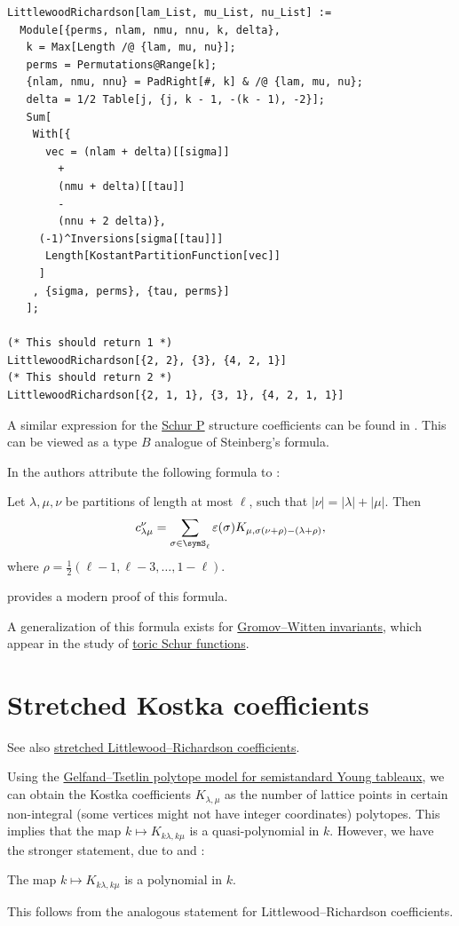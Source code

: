 \begin{lstlisting}
LittlewoodRichardson[lam_List, mu_List, nu_List] := 
  Module[{perms, nlam, nmu, nnu, k, delta},
   k = Max[Length /@ {lam, mu, nu}];
   perms = Permutations@Range[k];
   {nlam, nmu, nnu} = PadRight[#, k] & /@ {lam, mu, nu};
   delta = 1/2 Table[j, {j, k - 1, -(k - 1), -2}];
   Sum[
    With[{
      vec = (nlam + delta)[[sigma]]
        +
        (nmu + delta)[[tau]]
        -
        (nnu + 2 delta)},
     (-1)^Inversions[sigma[[tau]]]
      Length[KostantPartitionFunction[vec]]
     ]
    , {sigma, perms}, {tau, perms}]
   ];

(* This should return 1 *)
LittlewoodRichardson[{2, 2}, {3}, {4, 2, 1}]
(* This should return 2 *)
LittlewoodRichardson[{2, 1, 1}, {3, 1}, {4, 2, 1, 1}]

\end{lstlisting}


A similar expression for the \hyperref[schurP]{Schur P} structure
coefficients can be found in \cite[Thm.~6.2.5]{RassartThesis}.
This can be viewed as a type $B$ analogue of Steinberg's formula.


In \cite{BerensteinZelevinsky1988} the authors
attribute the following formula to :
\begin{theorem}[Kostant]
Let $\lambda,\mu,\nu$ be partitions of length at most $\ell$, such that $|\nu|=|\lambda|+|\mu|$. Then
\begin{equation}
c^{\nu}_{\lambda \mu} = \sum_{\sigma \in \symS_\ell} \varepsilon(\sigma) K_{\mu, \sigma(\nu+\rho)-(\lambda+\rho)},
\end{equation}
where $\rho = \tfrac12 (\ell-1,\ell-3,\dotsc,1-\ell)$.
\end{theorem}
 \cite{Shrivastava2022x} provides a modern proof of this formula.

A generalization of this formula exists 
for \hyperref[toricSchurIntoSchur]{Gromov--Witten invariants},
which appear in the study of \hyperref[schurToric]{toric Schur functions}.



\section[kostkaStretched]{Stretched Kostka coefficients}

See also \hyperref[lrStretched]{stretched Littlewood--Richardson coefficients}.

Using the \hyperref[gtKostka]{Gelfand--Tsetlin polytope model for semistandard Young tableaux},
we can obtain the Kostka coefficients $K_{\lambda,\mu}$ as the number of lattice points
in certain non-integral (some vertices might not have integer coordinates) polytopes.
This implies that the map $k \mapsto K_{k\lambda,k\mu}$ is a quasi-polynomial in $k$.
However, we have the stronger statement, due to 
and  \cite{DerksenWeyman2002}:
\begin{theorem}
The map $k \mapsto K_{k\lambda,k\mu}$ is a polynomial in $k$.
\end{theorem}
This follows from the analogous statement for Littlewood--Richardson coefficients.

